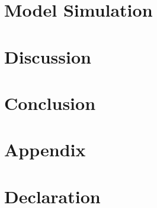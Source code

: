 \documentclass[ %
	paper=a4, %
	bibliography=totoc, %
	headings=optiontoheadandtoc
	]{scrartcl}
\begin{document}
\section{Model Simulation}


\section{Discussion}


\section{Conclusion}


\section{Appendix}


\section{Declaration}



% 

\newpage

\printbibliography %

\newpage


\end{document}
